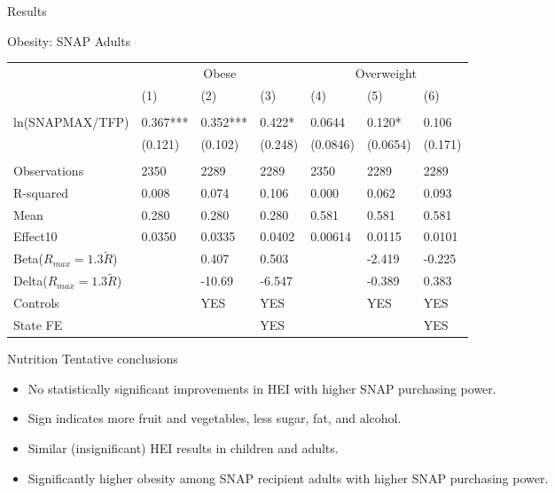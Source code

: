 \documentclass{beamer}
\begin{document}
\begin{frame}{Results}
\begin{table}{Obesity: SNAP Adults}
\begin{adjustbox}{max width=\textwidth}
\begin{tabular}{lllllll}
\toprule
 & \multicolumn{3}{c}{Obese} & \multicolumn{3}{c}{Overweight} \\
 & (1) & (2) & (3) & (4) & (5) & (6) \\
\midrule
 \\
ln(SNAPMAX/TFP) & 0.367*** & 0.352*** & 0.422* & 0.0644 & 0.120* & 0.106 \\
 & (0.121) & (0.102) & (0.248) & (0.0846) & (0.0654) & (0.171) \\
 \\
Observations & 2350 & 2289 & 2289 & 2350 & 2289 & 2289 \\
R-squared & 0.008 & 0.074 & 0.106 & 0.000 & 0.062 & 0.093 \\
Mean & 0.280 & 0.280 & 0.280 & 0.581 & 0.581 & 0.581 \\
Effect10 & 0.0350 & 0.0335 & 0.0402 & 0.00614 & 0.0115 & 0.0101 \\
Beta($R_{max}=1.3\tilde{R}$) &  & 0.407 & 0.503 &  & -2.419 & -0.225 \\
Delta($R_{max}=1.3\tilde{R}$) &  & -10.69 & -6.547 &  & -0.389 & 0.383 \\
Controls &&YES &YES &&YES & YES\\
State FE &  &  & YES &  &  & YES \\
\bottomrule
\end{tabular}

\end{adjustbox}
\end{table}
\end{frame}

\begin{frame}{Nutrition}
Tentative conclusions
 
\begin{itemize}
\item No statistically significant improvements in HEI with higher SNAP purchasing power.
\item Sign indicates more fruit and vegetables, less sugar, fat, and alcohol.
\item Similar (insignificant) HEI  results in children and adults.
\item Significantly higher obesity among SNAP recipient adults with higher SNAP purchasing power.
\end{itemize}
\end{frame}
\begin{frame}[plain]
\hspace{34mm}
\end{frame}
\end{document}
